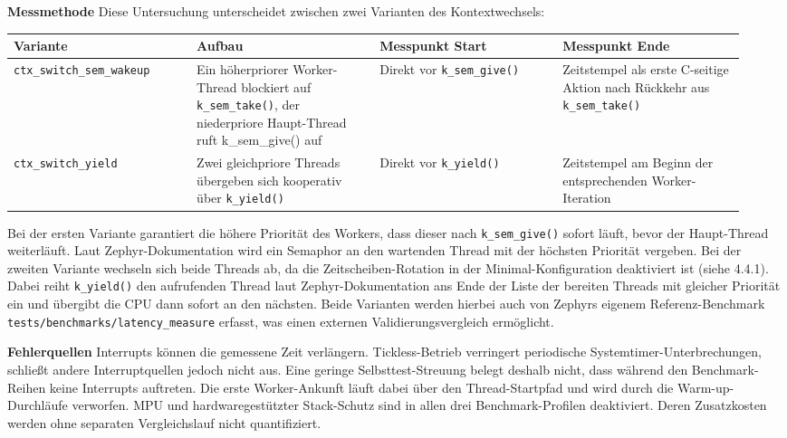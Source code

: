 \textbf{Messmethode} Diese Untersuchung unterscheidet zwischen zwei Varianten des Kontextwechsels:

\begin{longtable}{p{0.235\linewidth}p{0.235\linewidth}p{0.235\linewidth}p{0.235\linewidth}}
\toprule
Variante & Aufbau & Messpunkt Start & Messpunkt Ende \\
\midrule
\lstinline[style=fileinline]|ctx_switch_sem_wakeup| & Ein höherpriorer Worker-Thread blockiert auf \lstinline[style=fileinline]|k_sem_take()|, der niederpriore Haupt-Thread ruft k\_sem\_give() auf & Direkt vor \lstinline[style=fileinline]|k_sem_give()| & Zeitstempel als erste C-seitige Aktion nach Rückkehr aus \lstinline[style=fileinline]|k_sem_take()| \\
\lstinline[style=fileinline]|ctx_switch_yield| & Zwei gleichpriore Threads übergeben sich kooperativ über \lstinline[style=fileinline]|k_yield()| & Direkt vor \lstinline[style=fileinline]|k_yield()| & Zeitstempel am Beginn der entsprechenden Worker-Iteration \\
\bottomrule
\end{longtable}

Bei der ersten Variante garantiert die höhere Priorität des Workers, dass dieser nach \lstinline[style=fileinline]|k_sem_give()| sofort läuft, bevor der Haupt-Thread weiterläuft. Laut Zephyr-Dokumentation wird ein Semaphor an den wartenden Thread mit der höchsten Priorität vergeben. Bei der zweiten Variante wechseln sich beide Threads ab, da die Zeitscheiben-Rotation in der Minimal-Konfiguration deaktiviert ist (siehe 4.4.1). Dabei reiht \lstinline[style=fileinline]|k_yield()| den aufrufenden Thread laut Zephyr-Dokumentation ans Ende der Liste der bereiten Threads mit gleicher Priorität ein und übergibt die CPU dann sofort an den nächsten. Beide Varianten werden hierbei auch von Zephyrs eigenem Referenz-Benchmark \lstinline[style=fileinline]|tests/benchmarks/latency_measure| erfasst, was einen externen Validierungsvergleich ermöglicht.

\textbf{Fehlerquellen} Interrupts können die gemessene Zeit verlängern. Tickless-Betrieb verringert periodische Systemtimer-Unterbrechungen, schließt andere Interruptquellen jedoch nicht aus. Eine geringe Selbsttest-Streuung belegt deshalb nicht, dass während den Benchmark-Reihen keine Interrupts auftreten. Die erste Worker-Ankunft läuft dabei über den Thread-Startpfad und wird durch die Warm-up-Durchläufe verworfen. MPU und hardwaregestützter Stack-Schutz sind in allen drei Benchmark-Profilen deaktiviert. Deren Zusatzkosten werden ohne separaten Vergleichslauf nicht quantifiziert.

